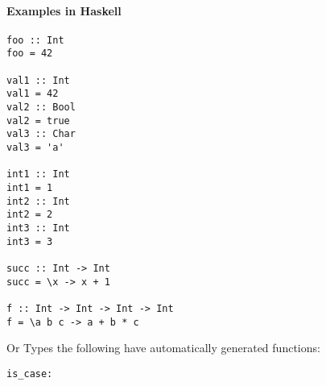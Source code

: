 \documentclass{article}
\def\H{Haskell}
\def\pend{\mbox{} \\\\}
\begin{document}
\paragraph{Examples in \H}
\begin{verbatim}
foo :: Int
foo = 42

val1 :: Int
val1 = 42
val2 :: Bool
val2 = true
val3 :: Char
val3 = 'a'

int1 :: Int
int1 = 1
int2 :: Int
int2 = 2
int3 :: Int
int3 = 3

succ :: Int -> Int
succ = \x -> x + 1

f :: Int -> Int -> Int -> Int
f = \a b c -> a + b * c
\end{verbatim}

Or Types the following have automatically generated functions:

\begin{verbatim}
is_case:
\end{verbatim}

%

%
%


\end{document}
